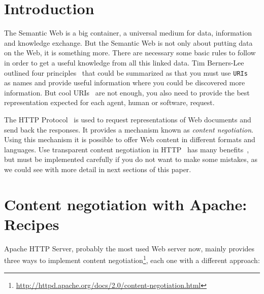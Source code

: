 
\section{Introduction}

The Semantic Web is a big container, a universal medium for data, information
and knowledge exchange. But the Semantic Web is not only about putting data on
the Web, it is something more. There are necessary some basic rules to follow
in order to get a useful knowledge from all this linked data. Tim Berners-Lee 
outlined four principles~\cite{TimBL2006} that could be summarized as that you 
must use \texttt{URIs}~\cite{RFC3986} as names and provide useful information 
where you could be discovered more information. But cool URIs~\cite{Sauermann2007} 
are not enough, you also need to provide the best representation expected for 
each agent, human or software, request.

The HTTP Protocol~\cite{HTTP} is used to request representations of Web documents
and send back the responses. It provides a mechanism known as \textit{content negotiation}.
Using this mechanism it is possible to offer Web content in different formats and
languages. Use transparent content negotiation in HTTP~\cite{Holtman1998} has many 
benefits~\cite{Seshan1998}, but must be implemented carefully if you do not want 
to make some mistakes, as we could see with more detail in next sections of this
paper.

\section{Content negotiation with Apache: Recipes}

Apache HTTP Server, probably the most used Web server now, mainly provides three ways 
to implement content negotiation\footnote{\url{http://httpd.apache.org/docs/2.0/content-negotiation.html}}, 
each one with a different approach:

